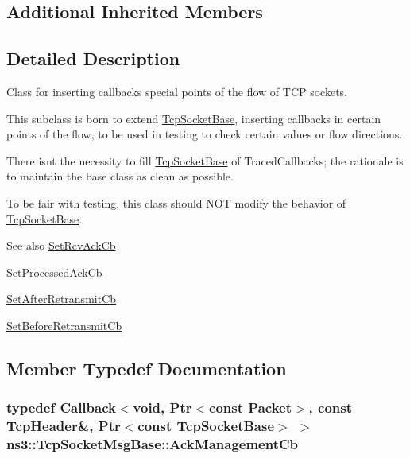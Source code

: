 \subsection*{Additional Inherited Members}


\subsection{Detailed Description}
Class for inserting callbacks special points of the flow of T\+CP sockets. 

This subclass is born to extend \hyperlink{classns3_1_1TcpSocketBase}{Tcp\+Socket\+Base}, inserting callbacks in certain points of the flow, to be used in testing to check certain values or flow directions.

There isn\textquotesingle{}t the necessity to fill \hyperlink{classns3_1_1TcpSocketBase}{Tcp\+Socket\+Base} of Traced\+Callbacks; the rationale is to maintain the base class as clean as possible.

To be fair with testing, this class should N\+OT modify the behavior of \hyperlink{classns3_1_1TcpSocketBase}{Tcp\+Socket\+Base}.

\begin{DoxySeeAlso}{See also}
\hyperlink{classns3_1_1TcpSocketMsgBase_a4ae6d1ea39fe99321a90d6580b62b006}{Set\+Rcv\+Ack\+Cb} 

\hyperlink{classns3_1_1TcpSocketMsgBase_a63f56f3eb470da75e4a347923dd0d3dc}{Set\+Processed\+Ack\+Cb} 

\hyperlink{classns3_1_1TcpSocketMsgBase_a235a26662ec9afef088bfca7f6a277b4}{Set\+After\+Retransmit\+Cb} 

\hyperlink{classns3_1_1TcpSocketMsgBase_a77cb047b2301736063e4d925f910be34}{Set\+Before\+Retransmit\+Cb} 
\end{DoxySeeAlso}


\subsection{Member Typedef Documentation}
\subsubsection[{\texorpdfstring{Ack\+Management\+Cb}{AckManagementCb}}]{\setlength{\rightskip}{0pt plus 5cm}typedef {\bf Callback}$<$void, {\bf Ptr}$<$const {\bf Packet}$>$, const {\bf Tcp\+Header}\&, {\bf Ptr}$<$const {\bf Tcp\+Socket\+Base}$>$ $>$ {\bf ns3\+::\+Tcp\+Socket\+Msg\+Base\+::\+Ack\+Management\+Cb}}\hypertarget{classns3_1_1TcpSocketMsgBase_a266be95f5377eb857b8b6fa75fa92784}{}\label{classns3_1_1TcpSocketMsgBase_a266be95f5377eb857b8b6fa75fa92784}


